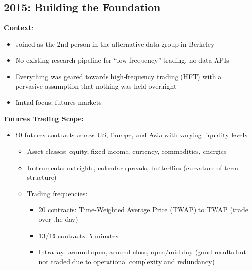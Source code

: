 \documentclass[11pt, letterpaper]{article}
\begin{document}
  \subsection{2015: Building the Foundation}
  \label{building-the-foundation}

  \textbf{Context}:

  \begin{itemize}
    \item Joined as the 2nd person in the alternative data group in Berkeley

    \item No existing research pipeline for ``low frequency'' trading,
      no data APIs

    \item Everything was geared towards high-frequency trading (HFT) with
      a pervasive assumption that nothing was held overnight

    \item Initial focus: futures markets
  \end{itemize}

  \textbf{Futures Trading Scope:}

  \begin{itemize}
    \item 80 futures contracts across US, Europe, and Asia with varying liquidity
      levels

      \begin{itemize}
        \item Asset classes: equity, fixed income, currency, commodities,
          energies

        \item Instruments: outrights, calendar spreads, butterflies (curvature
          of term structure)

        \item Trading frequencies:

          \begin{itemize}
            \item 20 contracts: Time-Weighted Average Price (TWAP) to
              TWAP (trade over the day)

            \item 13/19 contracts: 5 minutes

            \item Intraday: around open, around close, open/mid-day (good
              results but not traded due to operational complexity and redundancy)
          \end{itemize}
      \end{itemize}
  \end{itemize}
\end{document}
